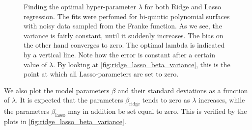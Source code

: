 \documentclass[dvipsnames, article, a4paper, oneside, 12pt]{memoir}
\newcommand{\ridge}{\mathrm{ridge}}
\newcommand{\lasso}{\mathrm{lasso}}
\begin{document}
  \begin{figure}[htpb]
  	\centering
	\caption{Finding the optimal hyper-parameter \( \lambda \) for both
		Ridge and Lasso regression. The fits were perfomed for
		bi-quintic polynomial surfaces with noisy data sampled from the
		Franke function. As we see, the variance is fairly constant,
	until it suddenly increases. The bias on the other hand converges to
	zero. The optimal lambda is indicated by a vertical line. Note how the error is
	constant after a certain value of \( \lambda \). By looking at
	\cref{fig:ridge_lasso_beta_variance}, this is the point at which all
	Lasso-parameters are set to zero.}%
  	\label{fig:bias_variance_lambda}
  \end{figure}

  We also plot the model parameters \( \beta \) and their standard deviations
  as a function of \( \lambda \).  It is expected that the parameters \(
  \beta_\ridge\) tends to zero as \( \lambda \) increases, while the parameters
  \( \beta_\lasso\) may in addition be set equal to zero. This is verified by
  the plots in \cref{fig:ridge_lasso_beta_variance}.
 
\end{document}

